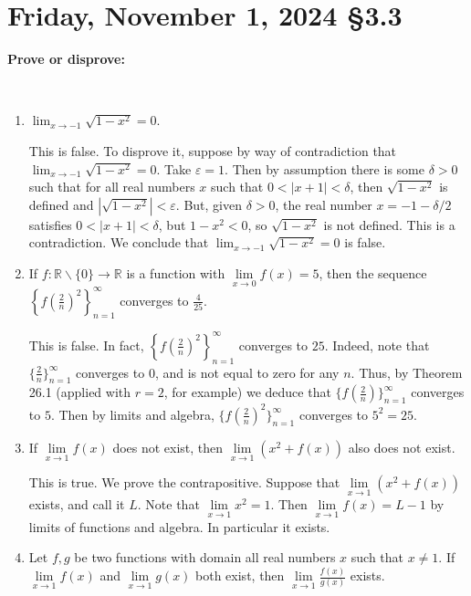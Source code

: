 \documentclass[12pt]{amsart}
\def\Fr{Friday}
\def\e{\varepsilon}
\numberwithin{equation}{section}
\theoremstyle{plain} %
\newcommand{\Nov}[3]{\section{#2, November #1, 2024 \quad \S#3}}
\theoremstyle{definition}
\theoremstyle{remark}
\begin{document}
\newpage




\Nov{1}{\Fr}{3.3}

\textbf{Prove or disprove:}
	
	\
	
	\begin{enumerate}
	\item $\displaystyle \lim_{x\to -1} \sqrt{1-x^2} = 0$.
	
	\begin{framed}
	This is false. To disprove it, suppose by way of contradiction that $\displaystyle \lim_{x\to -1} \sqrt{1-x^2} = 0$. Take $\e=1$. Then by assumption there is some $\delta>0$ such that for all real numbers $x$ such that $0<|x+1|<\delta$, then $\sqrt{1-x^2}$ is defined and $|\sqrt{1-x^2}|<\e$. But, given $\delta>0$, the real number $x=-1-\delta/2$ satisfies $0<|x+1|<\delta$, but $1-x^2<0$, so  $\sqrt{1-x^2}$ is not defined. This is a contradiction. We conclude that $\displaystyle \lim_{x\to -1} \sqrt{1-x^2} = 0$ is false.
	\end{framed}
	
	\item If $f: \mathbb{R} \smallsetminus \{0\}\to \mathbb{R}$ is a function with $\lim\limits_{x\to 0} f(x) = 5$, then the sequence $\left\{f\!\left(\frac{2}{n}\right)^{2} \right\}_{n=1}^\infty$ converges to $\displaystyle\frac{4}{25}$.
	
	\begin{framed}
	This is false. In fact, $\left\{f\!\left(\frac{2}{n}\right)^{2} \right\}_{n=1}^\infty$ converges to $25$. Indeed, note that $\{ \frac{2}{n}\}_{n=1}^\infty$ converges to $0$, and is not equal to zero for any $n$. Thus, by Theorem 26.1 (applied with $r=2$, for example) we deduce that $\{ f( \frac{2}{n})\}_{n=1}^\infty$ converges to $5$. Then by limits and algebra, $\{ f( \frac{2}{n})^2\}_{n=1}^\infty$ converges to $5^2=25$.
		\end{framed}
	
	\item If $\lim\limits_{x\to 1} f(x)$ does not exist, then $\lim\limits_{x\to 1} \left(x^2 + f(x)\right)$ also does not exist.
	\begin{framed}
	This is true. 
	We prove the contrapositive. Suppose that $\lim\limits_{x\to 1} \left(x^2 + f(x)\right)$ exists, and call it $L$. Note that $\lim\limits_{x\to 1} x^2 = 1$. Then $\lim\limits_{x\to 1} f(x) = L - 1$  by limits of functions and algebra. In particular it exists.
		\end{framed}
	
	\item Let $f,g$ be two functions with domain all real numbers $x$ such that $x\neq 1$. If $\lim\limits_{x\to 1} f(x)$ and $\lim\limits_{x\to 1} g(x)$ both exist, then $\lim\limits_{x\to 1} \displaystyle\frac{f(x)}{g(x)}$ exists.

\end{enumerate}
\end{document}
